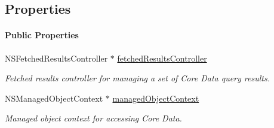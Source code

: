 \subsection*{Properties}
\begin{Indent}\paragraph*{Public Properties}
\begin{DoxyCompactItemize}
\item 
\hypertarget{interface_p_c_master_view_controller_ae252aefdba7443b1ca105d8ee3b90e20}{
NSFetchedResultsController $\ast$ \hyperlink{interface_p_c_master_view_controller_ae252aefdba7443b1ca105d8ee3b90e20}{fetchedResultsController}}
\label{interface_p_c_master_view_controller_ae252aefdba7443b1ca105d8ee3b90e20}

\begin{DoxyCompactList}\small\item\em Fetched results controller for managing a set of Core Data query results. \end{DoxyCompactList}\item 
\hypertarget{interface_p_c_master_view_controller_a6aca94a2f6cebc722d70b752e15f1ec6}{
NSManagedObjectContext $\ast$ \hyperlink{interface_p_c_master_view_controller_a6aca94a2f6cebc722d70b752e15f1ec6}{managedObjectContext}}
\label{interface_p_c_master_view_controller_a6aca94a2f6cebc722d70b752e15f1ec6}

\begin{DoxyCompactList}\small\item\em Managed object context for accessing Core Data. \end{DoxyCompactList}\end{DoxyCompactItemize}
\end{Indent}
